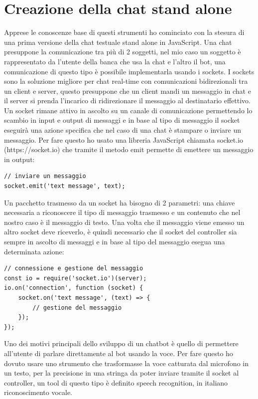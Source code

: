 \section{Creazione della chat stand alone}
Apprese le conoscenze base di questi strumenti ho cominciato con la stesura di una prima versione della chat testuale stand alone in JavaScript. Una chat presuppone la comunicazione tra più di 2 soggetti, nel mio caso un soggetto è rappresentato da l'utente della banca che usa la chat e l'altro il bot, una comunicazione di questo tipo è possibile implementarla usando i sockets.
I sockets sono la soluzione migliore per chat real-time con comunicazioni bidirezionali tra un client e server, questo presuppone che un client mandi un messaggio in chat e il server si prenda l'incarico di ridirezionare il messaggio al destinatario effettivo. Un socket rimane attivo in ascolto su un canale di comunicazione permettendo lo scambio in input e output di messaggi e in base al tipo di messaggio il socket eseguirà una azione specifica che nel caso di una chat è stampare o inviare un messaggio. Per fare questo ho usato una libreria JavaScript chiamata socket.io (https://socket.io) che tramite il metodo emit permette di emettere un messaggio in output:
\begin{lstlisting}
// inviare un messaggio
socket.emit('text message', text);
\end{lstlisting}
Un pacchetto trasmesso da un socket ha bisogno di 2 parametri: una chiave necessaria a riconoscere il tipo di messaggio trasmesso e un contenuto che nel nostro caso è il messaggio di testo.
Una volta che il messaggio viene emesso un altro socket deve riceverlo, è quindi necessario che il socket del controller sia sempre in ascolto di messaggi e in base al tipo del messaggio esegua una determinata azione:
\begin{lstlisting}
// connessione e gestione del messaggio
const io = require('socket.io')(server);
io.on('connection', function (socket) {
    socket.on('text message', (text) => {
        // gestione del messaggio
    });
});
\end{lstlisting}

Uno dei motivi principali dello sviluppo di un chatbot è quello di permettere all'utente di parlare direttamente al bot usando la voce. Per fare questo ho dovuto usare uno strumento che trasformasse la voce catturata dal microfono in un testo, per la precisione in una stringa da poter inviare tramite il socket al controller, un tool di questo tipo è definito speech recognition, in italiano riconoscimento vocale.
